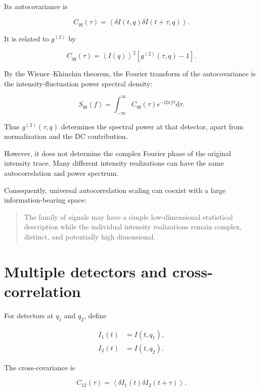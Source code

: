 \documentclass[11pt,letterpaper]{article}
\newcommand{\gtt}{g^{(2)}}
\newcommand{\avg}[1]{\left\langle #1 \right\rangle}
\renewcommand{\dd}{\mathrm{d}}
\newcommand{\ii}{\mathrm{i}}
\begin{document}
Its autocovariance is

\begin{equation}
    C_{qq}(\tau)
    =
    \avg{
    \delta I(t,q)
    \delta I(t+\tau,q)
    }.
\end{equation}

It is related to $\gtt$ by

\begin{equation}
    C_{qq}(\tau)
    =
    \avg{I(q)}^2
    \left[
    \gtt(\tau,q)-1
    \right].
\end{equation}

By the Wiener--Khinchin theorem, the Fourier transform of the
autocovariance is the intensity-fluctuation power spectral density:

\begin{equation}
    S_{qq}(f)
    =
    \int_{-\infty}^{\infty}
    C_{qq}(\tau)
    e^{-\ii 2\pi f\tau}
    \dd\tau.
    \label{eq:wiener_khinchin}
\end{equation}

Thus $\gtt(\tau,q)$ determines the spectral power at that detector, apart
from normalization and the DC contribution.

However, it does not determine the complex Fourier phase of the original
intensity trace. Many different intensity realizations can have the same
autocorrelation and power spectrum.

Consequently, universal autocorrelation scaling can coexist with a large
information-bearing space:

\begin{quote}
The family of signals may have a simple low-dimensional statistical
description while the individual intensity realizations remain complex,
distinct, and potentially high dimensional.
\end{quote}

\section{Multiple detectors and cross-correlation}

For detectors at $q_1$ and $q_2$, define

\begin{align}
    I_1(t)&=I(t,q_1),\\
    I_2(t)&=I(t,q_2).
\end{align}

The cross-covariance is

\begin{equation}
    C_{12}(\tau)
    =
    \avg{
    \delta I_1(t)
    \delta I_2(t+\tau)
    }.
    \label{eq:cross_covariance}
\end{equation}
\end{document}
